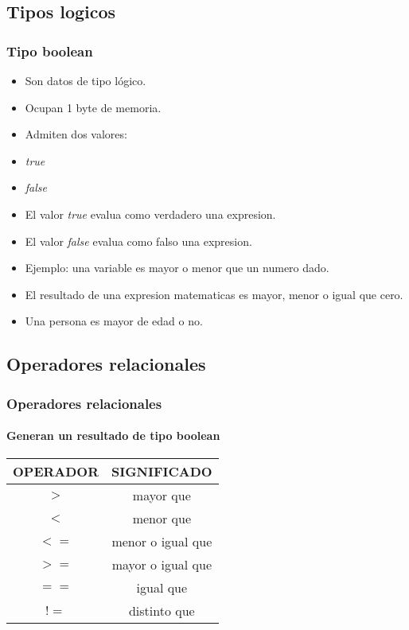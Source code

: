 \documentclass{beamer}
\begin{document}
\subsection{Tipos logicos}
\begin{frame}
    \frametitle{Tipo boolean}

\begin{itemize}[<+-| alert@+>]
      \item Son datos de tipo lógico.
      \item Ocupan 1 byte de memoria.
      \item Admiten dos valores:      
      \item \emph{true} 
      \item \emph{false}
      \item El valor \emph{true} evalua como verdadero una expresion.
      \item El valor \emph{false} evalua como falso una expresion.
      \item Ejemplo: una variable es mayor o menor que un numero dado.
      \item El resultado de una expresion matematicas es mayor, menor o igual que cero.
      \item Una persona es  mayor de edad o no.
    \end{itemize}
    \pause
\end{frame}

\subsection{Operadores relacionales}

\begin{frame}[fragile]
    \frametitle{Operadores relacionales}
    \framesubtitle{Generan un resultado de tipo boolean}
    \pause
    \begin{center}
		\begin{tabular}{|c|c|}
		\hline
		OPERADOR & SIGNIFICADO\\
		\hline
		$>$ & mayor que \\
		\hline
		$<$ & menor que \\
		\hline
		$<=$ & menor o igual que \\
		\hline
		$>=$ & mayor o igual que \\
		\hline
		$==$ & igual que \\
		\hline
		$!=$ & distinto que \\
		\hline
\end{tabular}
	\end{center}
\end{frame}
\end{document}
